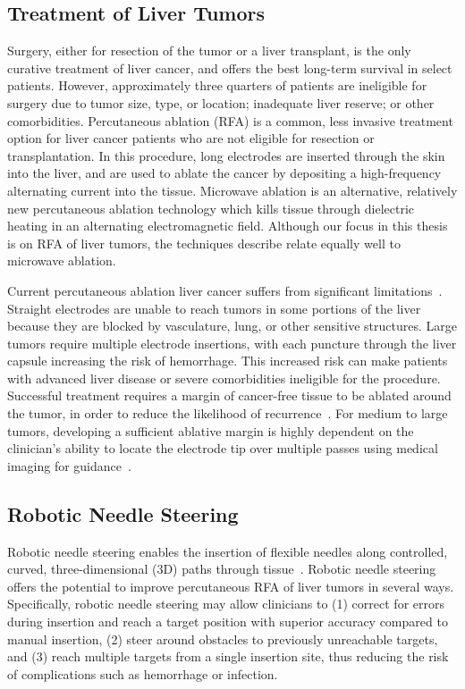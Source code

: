 \subsection{Treatment of Liver Tumors}
Surgery, either for resection of the tumor or a liver transplant, is the only curative treatment of liver cancer, and offers the best long-term survival in select patients. However, approximately three quarters of patients are ineligible for surgery due to tumor size, type, or location; inadequate liver reserve; or other comorbidities. Percutaneous  ablation (RFA) is a common, less invasive treatment option for liver cancer patients who are not eligible for resection or transplantation. In this procedure, long electrodes are inserted through the skin into the liver, and are used to ablate the cancer by depositing a high-frequency alternating current into the tissue. Microwave ablation is an alternative, relatively new percutaneous ablation technology which kills tissue through dielectric heating in an alternating electromagnetic field. Although our focus in this thesis is on RFA of liver tumors, the techniques describe relate equally well to microwave ablation. 

Current percutaneous ablation liver cancer suffers from significant limitations~\cite{Gervais2009}. Straight electrodes are unable to reach tumors in some portions of the liver because they are blocked by vasculature, lung, or other sensitive structures. Large tumors require multiple electrode insertions, with each puncture through the liver capsule increasing the risk of hemorrhage. This increased risk can make patients with advanced liver disease or severe comorbidities ineligible for the procedure. Successful treatment requires a margin of cancer-free tissue to be ablated around the tumor, in order to reduce the likelihood of recurrence~\cite{Kim2006}. For medium to large tumors, developing a sufficient ablative margin is highly dependent on the clinician's ability to locate the electrode tip over multiple passes using medical imaging for guidance~\cite{Dodd2001}. 

\subsection{Robotic Needle Steering}
Robotic needle steering enables the insertion of flexible needles along controlled, curved, three-dimensional (3D) paths through tissue~\cite{DiMaio2005,Webster2006}. Robotic needle steering offers the potential to improve percutaneous RFA of liver tumors in several ways. Specifically, robotic needle steering may allow clinicians to (1) correct for errors during insertion and reach a target position with superior accuracy compared to manual insertion, (2) steer around obstacles to previously unreachable targets, and (3) reach multiple targets from a single insertion site, thus reducing the risk of complications such as hemorrhage or infection.

